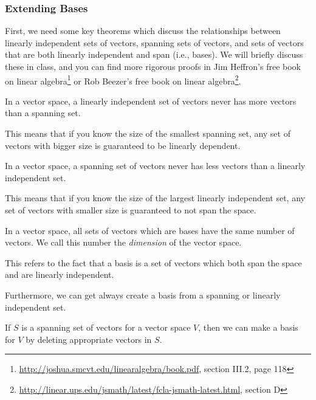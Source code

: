 \subsubsection{Extending Bases}
\label{sec:extending-bases}

First, we need some key theorems which discuss the relationships between linearly independent sets of vectors, spanning sets of vectors, and sets of vectors that are both linearly independent and span (i.e., bases).  We will briefly discuss these in class, and you can find more rigorous proofs in Jim Heffron's free book on linear algebra\footnote{\url{http://joshua.smcvt.edu/linearalgebra/book.pdf}, section III.2, page 118} or Rob Beezer's free book on linear algebra\footnote{\url{http://linear.ups.edu/jsmath/latest/fcla-jsmath-latest.html}, section D}.

\begin{theorem}
  In a vector space, a linearly independent set of vectors never
  has more vectors than a spanning set.
\end{theorem}

This means that if you know the size of the smallest spanning set, any set of vectors with bigger size is guaranteed to be linearly dependent.

\begin{theorem}
  In a vector space, a spanning set of vectors never has less vectors
  than a linearly independent set.
\end{theorem}

This means that if you know the size of the largest linearly independent set, any set of vectors with smaller size is guaranteed to not span the space.

\begin{theorem}
  In a vector space, all sets of vectors which are bases have the same number of vectors.  We call this number the \emph{dimension} of the vector space.
\end{theorem}

This refers to the fact that a basis is a set of vectors which both span the space and are linearly independent.

Furthermore, we can get always create a basis from a spanning or linearly independent set.

\begin{theorem}
  If $S$ is a spanning set of vectors for a vector space $V$, then we can make a basis for $V$ by deleting appropriate vectors in $S$.
\end{theorem}

